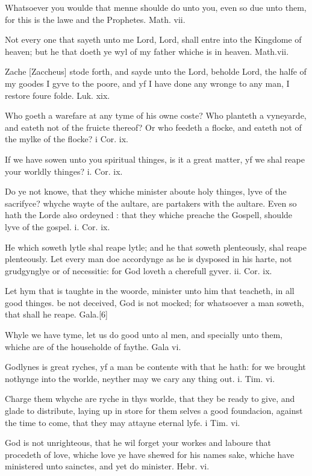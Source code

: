 Whatsoever you woulde that menne shoulde do unto you, even so due unto
them, for this is the lawe and the Prophetes. Math.
vii.

Not every one that sayeth unto me Lord, Lord, shall entre into the Kingdome
of heaven; but he that doeth ye wyl of my father whiche is in heaven.
Math.\textbf{}vii.

Zache [Zaccheus]
stode forth, and sayde unto the Lord, beholde Lord, the halfe of my goodes
I gyve to the poore, and yf I have done any wronge to any man,
I restore foure folde. Luk.
xix.

Who goeth a warefare at any tyme of his owne coste? Who planteth a vyneyarde,
and eateth not of the fruicte thereof? Or who feedeth a flocke, and eateth
not of the mylke of the flocke? i
Cor. ix.

If we have sowen unto you spiritual thinges, is it a great matter, yf
we shal reape your worldly thinges? i.
Cor. ix.

Do ye not knowe, that they whiche minister aboute holy thinges, lyve of
the sacrifyce? whyche wayte of the aultare, are partakers with the aultare.
Even so hath the Lorde also ordeyned : that they whiche preache the Gospell,
shoulde lyve of the gospel. i.
Cor. ix.

He which soweth lytle shal reape lytle; and he that soweth plenteously,
shal reape plenteously. Let every man doe accordynge as he is dysposed
in his harte, not grudgynglye or of necessitie: for God loveth a cherefull
gyver. ii.
Cor. ix.

Let hym that is taughte in the woorde, minister unto him that teacheth,
in all good thinges. be not deceived, God is not mocked; for whatsoever
a man soweth, that shall he reape. Gala.\textbf{}[6]

Whyle we have tyme, let us do good unto al men, and specially unto them,
whiche are of the householde of faythe. Gala
vi.

Godlynes is great ryches, yf a man be contente with that he hath: for
we brought nothynge into the worlde, neyther may we cary any thing out. i.
Tim. vi.

Charge them whyche are ryche in thys worlde, that they be ready to give,
and glade to distribute, laying up in store for them selves a good foundacion,
against the time to come, that they may attayne eternal lyfe. i
Tim. vi.

God is not unrighteous, that he wil forget your workes and laboure that
procedeth of love, whiche love ye have shewed for his names sake, whiche
have ministered unto sainctes, and yet do minister. Hebr.
vi.

